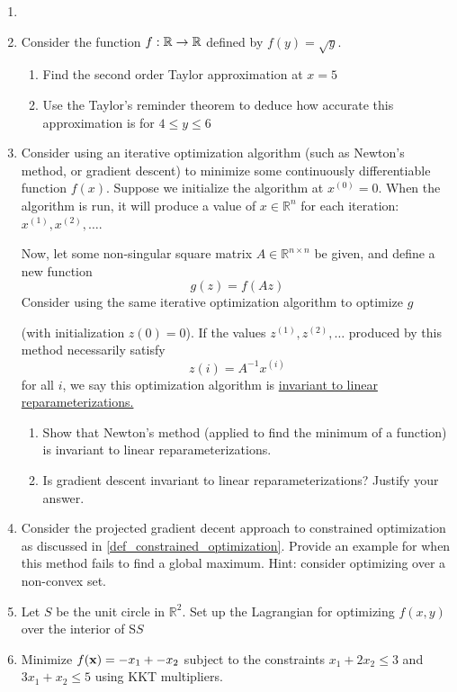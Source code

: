 \begin{enumerate}
    \item 
    \item Consider the function $f: \R \to \R$ defined by $f(y) = \sqrt{y}$. 
    \begin{enumerate}
        \item Find the second order Taylor approximation at $x=5$
        \item Use the Taylor's reminder theorem to deduce how accurate this approximation is for $4 \leq y \leq 6$
    \end{enumerate}
\item Consider using an iterative optimization algorithm (such as Newton’s method, or gradient descent) to minimize some continuously differentiable function $f(x)$. Suppose we initialize the
algorithm at $x^{(0)} = 0$. When the algorithm is run, it will produce a value of $x \in \mathbb R^n$ for each iteration: $ x^{(1)}, x^{(2)}, \ldots$.

Now, let some non-singular square matrix $A \in \mathbb R^{n \times n}$ be given, and define a new function 
$$g(z) = f(Az)$$
Consider using the same iterative optimization algorithm to optimize $g$ 

(with initialization $z(0) = 0$). If the values $z^{(1)},z^{(2)},\ldots$ produced by this method necessarily satisfy
$$z(i) = A^{-1} x^{(i)}$$ for all $i$, we say this optimization algorithm is \underline{invariant to linear reparameterizations.}

\begin{enumerate}
\item Show that Newton’s method (applied to find the minimum of a function) is invariant to linear reparameterizations.
\item Is gradient descent invariant to linear reparameterizations? Justify your answer.
\end{enumerate}

\item Consider the projected gradient decent approach to constrained optimization as discussed in \ref{def_constrained_optimization}. Provide an example for when this method fails to find a global maximum. Hint: consider optimizing over a non-convex set.
\item Let $S$ be the unit circle in $\mathbb R^2$. Set up the Lagrangian for optimizing $f(x,y)$ over the interior of S$S$ 
\item Minimize $f(\vx) = -x_1 + -x_2$ subject to the constraints $x_1 + 2x_2 \leq 3$ and $3x_1 + x_2 \leq 5$ using KKT multipliers. 

\end{enumerate}


